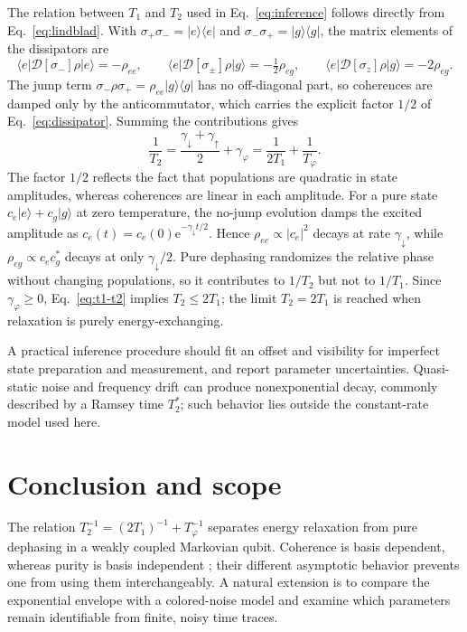 \documentclass[10pt,a4paper]{article}
\newcommand{\ket}[1]{\lvert #1\rangle}
\newcommand{\bra}[1]{\langle #1\rvert}
\newcommand{\D}{\mathcal{D}}
\newcommand{\ee}{\mathrm{e}}
\begin{document}
The relation between $T_1$ and $T_2$ used in Eq.~\eqref{eq:inference}
follows directly from Eq.~\eqref{eq:lindblad}. With
$\sigma_+\sigma_-=\ket{e}\bra{e}$ and $\sigma_-\sigma_+=\ket{g}\bra{g}$,
the matrix elements of the dissipators are
\begin{equation}
 \bra{e}\D[\sigma_-]\rho\ket{e}=-\rho_{ee},\qquad
 \bra{e}\D[\sigma_\pm]\rho\ket{g}=-\tfrac{1}{2}\rho_{eg},\qquad
 \bra{e}\D[\sigma_z]\rho\ket{g}=-2\rho_{eg}.
 \label{eq:dissipator-elements}
\end{equation}
The jump term $\sigma_-\rho\sigma_+=\rho_{ee}\ket{g}\bra{g}$ has no
off-diagonal part, so coherences are damped only by the anticommutator,
which carries the explicit factor $1/2$ of Eq.~\eqref{eq:dissipator}.
Summing the contributions gives
\begin{equation}
 \frac{1}{T_2}
 =\frac{\gamma_\downarrow+\gamma_\uparrow}{2}+\gamma_\varphi
 =\frac{1}{2T_1}+\frac{1}{T_\varphi}.
 \label{eq:t1-t2}
\end{equation}
The factor $1/2$ reflects the fact that populations are quadratic in state
amplitudes, whereas coherences are linear in each amplitude. For a pure
state $c_e\ket{e}+c_g\ket{g}$ at zero temperature, the no-jump evolution
damps the excited amplitude as $c_e(t)=c_e(0)\ee^{-\gamma_\downarrow t/2}$.
Hence $\rho_{ee}\propto|c_e|^2$ decays at rate $\gamma_\downarrow$,
while $\rho_{eg}\propto c_e c_g^*$ decays at only $\gamma_\downarrow/2$.
Pure dephasing randomizes the relative phase without changing populations,
so it contributes to $1/T_2$ but not to $1/T_1$. Since
$\gamma_\varphi\geq0$, Eq.~\eqref{eq:t1-t2} implies $T_2\leq2T_1$;
the limit $T_2=2T_1$ is reached when relaxation is purely
energy-exchanging.

A practical inference procedure should fit an offset and visibility for
imperfect state preparation and measurement, and report parameter
uncertainties. Quasi-static noise and frequency drift can produce
nonexponential decay, commonly described by a Ramsey time $T_2^*$;
such behavior lies outside the constant-rate model used here.

\section{Conclusion and scope}

The relation $T_2^{-1}=(2T_1)^{-1}+T_\varphi^{-1}$ separates energy
relaxation from pure dephasing in a weakly coupled Markovian qubit.
Coherence is basis dependent, whereas purity is basis independent
\cite{nielsen}; their different asymptotic behavior prevents one from
using them interchangeably. A natural extension is to compare the
exponential envelope with a colored-noise model and examine which
parameters remain identifiable from finite, noisy time traces.
\end{document}

